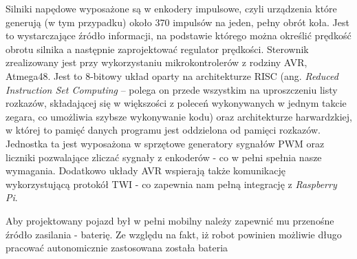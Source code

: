Silniki napędowe wyposażone są w enkodery impulsowe, czyli  urządzenia które generują (w tym przypadku) około 370 impulsów na jeden, pełny obrót koła. Jest to wystarczające źródło informacji, na podstawie którego można określić prędkość obrotu silnika a następnie zaprojektować regulator prędkości. Sterownik zrealizowany jest przy wykorzystaniu  mikrokontrolerów z rodziny AVR, Atmega48. Jest to 8-bitowy układ oparty na architekturze RISC (ang. \textit{Reduced Instruction Set Computing} – polega on przede wszystkim na uproszczeniu listy rozkazów, składającej się w większości z poleceń wykonywanych w jednym takcie zegara, co umożliwia szybsze wykonywanie kodu) oraz architekturze harwardzkiej, w której to pamięć danych programu jest oddzielona od pamięci rozkazów. Jednostka ta jest wyposażona w sprzętowe generatory sygnałów PWM oraz liczniki pozwalające zliczać sygnały z enkoderów - co w pełni spełnia nasze wymagania. Dodatkowo układy AVR wspierają także komunikację wykorzystującą protokół TWI - co zapewnia nam pełną integrację z \textit{Raspberry Pi}.

Aby projektowany pojazd był w pełni mobilny należy zapewnić mu przenośne źródło zasilania - baterię. Ze względu na fakt, iż robot powinien możliwie długo pracować autonomicznie zastosowana została bateria 
